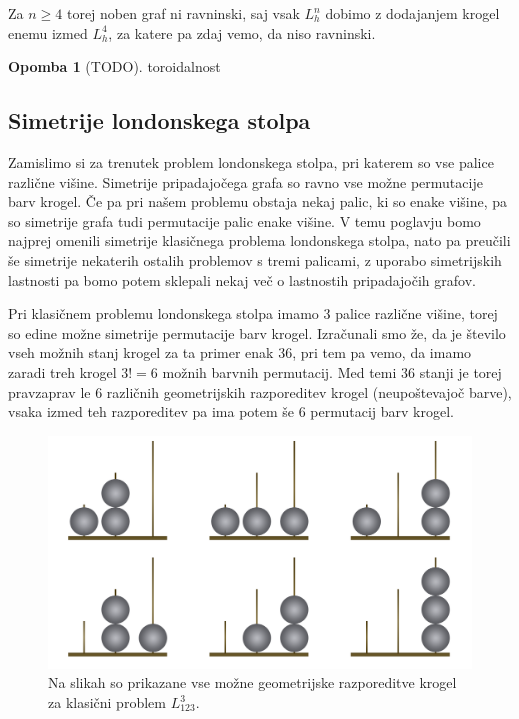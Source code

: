 \documentclass[12pt,a4paper]{amsart}
\theoremstyle{definition} %
\newtheorem{opomba}[definicija]{Opomba}
\theoremstyle{plain} %
\begin{document}
    Za $n \geq 4$ torej noben graf ni ravninski, saj vsak $L_h^n$ dobimo z dodajanjem krogel enemu izmed $L_h^4$, za katere pa zdaj vemo, da niso ravninski.
\endproof

\begin{opomba}
    [TODO] toroidalnost
\end{opomba}

\subsection{Simetrije londonskega stolpa}

Zamislimo si za trenutek problem londonskega stolpa, pri katerem so vse palice različne višine. Simetrije pripadajočega grafa so ravno vse možne permutacije barv krogel.
Če pa pri našem problemu obstaja nekaj palic, ki so enake višine, pa so simetrije grafa tudi permutacije palic enake višine.
V temu poglavju bomo najprej omenili simetrije klasičnega problema londonskega stolpa, nato pa preučili še simetrije nekaterih ostalih problemov s tremi palicami, z uporabo simetrijskih lastnosti pa bomo potem sklepali nekaj več o lastnostih pripadajočih grafov.

Pri klasičnem problemu londonskega stolpa imamo $3$ palice različne višine, torej so edine možne simetrije permutacije barv krogel. 
Izračunali smo že, da je število vseh možnih stanj krogel za ta primer enak 36, pri tem pa vemo, da imamo zaradi treh krogel $3! = 6$ možnih barvnih permutacij. Med temi $36$ stanji je torej pravzaprav le $6$ različnih geometrijskih razporeditev krogel (neupoštevajoč barve), vsaka izmed teh razporeditev pa ima potem še $6$ permutacij barv krogel.

\begin{figure}
    \includegraphics[width=400pt]{img/london-tower-nocolor-all.png}
    \caption{Na slikah so prikazane vse možne geometrijske razporeditve krogel za klasični problem $L_{123}^3$.}
\end{figure}
\end{document}
